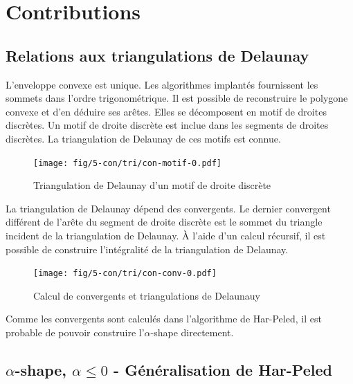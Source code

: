 \section{Contributions}

\subsection{Relations aux triangulations de Delaunay}


L'enveloppe convexe est unique. Les algorithmes implantés fournissent les sommets dans l'ordre trigonométrique. Il est possible de reconstruire le polygone convexe et d'en déduire ses arêtes. Elles se décomposent en motif de droites discrètes. Un motif de droite discrète est inclue dans les segments de droites discrètes. La triangulation de Delaunay de ces motifs est connue. \cite{RoussillonL11}\\

\begin{figure}[H]
  \centering
  \texttt{[image: fig/5-con/tri/con-motif-0.pdf]}
  \caption{Triangulation de Delaunay d'un motif de droite discrète}
\end{figure}

La triangulation de Delaunay dépend des convergents. Le dernier convergent différent de l'arête du segment de droite discrète est le sommet du triangle incident de la triangulation de Delaunay. À l'aide d'un calcul récursif, il est possible de construire l'intégralité de la triangulation de Delaunay.

\begin{figure}[H]
  \centering
  \texttt{[image: fig/5-con/tri/con-conv-0.pdf]}
  \caption{Calcul de convergents et triangulations de Delaunauy}
\end{figure}

Comme les convergents sont calculés dans l’algorithme de Har-Peled, il est probable de pouvoir construire l'$\alpha$-shape directement. 

\subsection{$\alpha$-shape, $\alpha \leq 0$ - Généralisation de Har-Peled}

